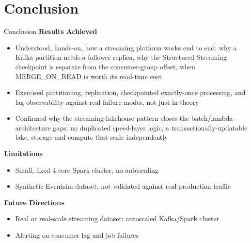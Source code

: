 \documentclass[aspectratio=169]{beamer}
\begin{document}
\section{Conclusion}

\begin{frame}{Conclusion}
\textbf{Results Achieved}
\begin{itemize}\setlength\itemsep{4pt}\small
  \item Understood, hands-on, how a streaming platform works end to end: why a Kafka partition needs a follower replica, why the Structured Streaming checkpoint is separate from the consumer-group offset, when MERGE\_ON\_READ is worth its read-time cost
  \item Exercised partitioning, replication, checkpointed exactly-once processing, and lag observability against real failure modes, not just in theory
  \item Confirmed why the streaming-lakehouse pattern closes the batch/lambda-architecture gaps: no duplicated speed-layer logic, a transactionally-updatable lake, storage and compute that scale independently
\end{itemize}

\vspace{0.2cm}
\textbf{Limitations}
\begin{itemize}\small
  \item Small, fixed 4-core Spark cluster, no autoscaling
  \item Synthetic Eventsim dataset, not validated against real production traffic
\end{itemize}

\vspace{0.2cm}
\textbf{Future Directions}
\begin{itemize}\small
  \item Real or real-scale streaming dataset; autoscaled Kafka/Spark cluster
  \item Alerting on consumer lag and job failures
\end{itemize}
\end{frame}

\end{document}
